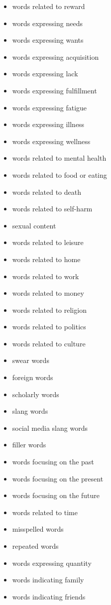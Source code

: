 \begin{multicols}{2}
\begin{itemize}[nolistsep]
    \item words related to reward
    \item words expressing needs
    \item words expressing wants
    \item words expressing acquisition
    \item words expressing lack
    \item words expressing fulfillment
    \item words expressing fatigue
    \item words expressing illness
    \item words expressing wellness
    \item words related to mental health
    \item words related to food or eating
    \item words related to death
    \item words related to self-harm
    \item sexual content
    \item words related to leisure
    \item words related to home
    \item words related to work
    \item words related to money
    \item words related to religion
    \item words related to politics
    \item words related to culture
    \item swear words
    \item foreign words
    \item scholarly words
    \item slang words
    \item social media slang words
    \item filler words
    \item words focusing on the past
    \item words focusing on the present
    \item words focusing on the future
    \item words related to time
    \item misspelled words
    \item repeated words
    \item words expressing quantity
    \item words indicating family
    \item words indicating friends

\end{itemize}
\end{multicols}
